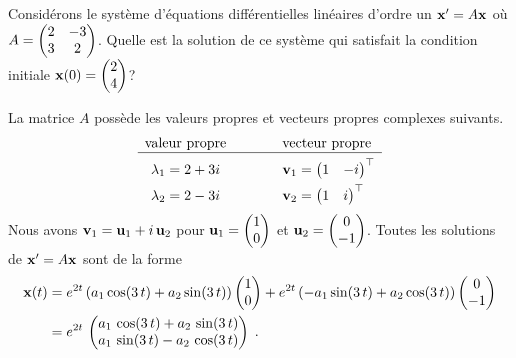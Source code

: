 {\begin{egg}
Considérons le système d'équations différentielles linéaires d'ordre un
$\mathbf{x}' = A\mathbf{x}$ où
$\displaystyle A = \begin{pmatrix} 2 & -3 \\ 3 & 2 \end{pmatrix}$.
Quelle est la solution de ce système qui satisfait la condition initiale
$\displaystyle \mathbf{x}(0) = \begin{pmatrix} 2 \\ 4 \end{pmatrix}$?

La matrice $A$ possède les valeurs propres et vecteurs propres complexes
suivants.
\[
\begin{array}{ccl}
\text{valeur propre} & \hspace*{2em} & \text{vecteur propre} \\
\hline
\rule{0pt}{1.5em} \lambda_1 = 2+3i & &
\VEC{v}_1 = \begin{pmatrix} 1 & -i \end{pmatrix}^\top \\[0.4em]
\lambda_2 = 2-3i & & \VEC{v}_2 = \begin{pmatrix} 1 & i \end{pmatrix}^\top
\end{array}
\]
Nous avons $\mathbf{v}_1 = \mathbf{u}_1 + i \, \mathbf{u}_2$ pour
$\displaystyle \mathbf{u}_1 = \begin{pmatrix} 1 \\ 0 \end{pmatrix}$
et $\displaystyle \mathbf{u}_2 = \begin{pmatrix} 0 \\ -1 \end{pmatrix}$.
Toutes les solutions de $\mathbf{x}'= A \mathbf{x}$ sont de la forme
\begin{align*}
\mathbf{x}(t) &
= e^{2t}\left( a_1 \cos(3\,t) + a_2 \sin(3\,t) \right)
\begin{pmatrix} 1 \\ 0 \end{pmatrix}
+ e^{2t}\left( -a_1 \sin(3\,t) + a_2 \cos(3\,t) \right)
\begin{pmatrix} 0 \\ -1 \end{pmatrix} \\
&= e^{2t}\, \begin{pmatrix}
a_1\,\cos(3\,t) + a_2\,\sin(3\,t) \\
a_1\,\sin(3\,t) - a_2\,\cos(3\,t)
\end{pmatrix} \; .
\end{align*}

\end{egg}}
